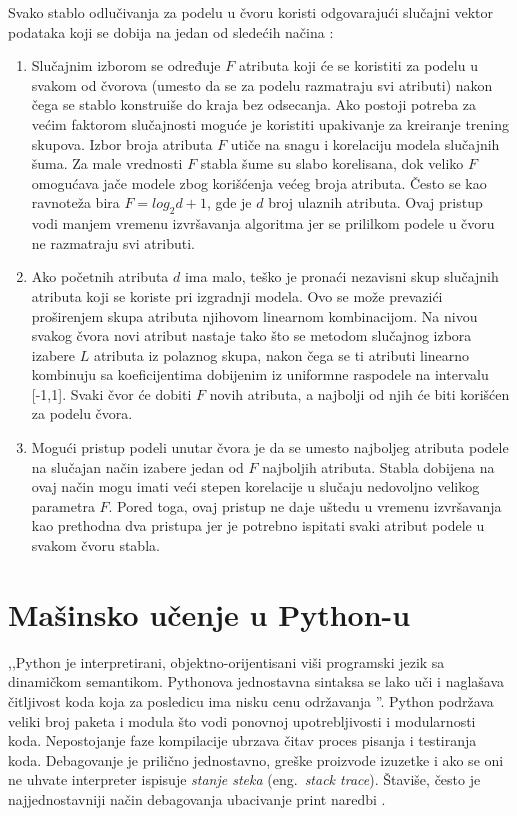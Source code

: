 \documentclass[12pt,oneside]{memoir}
\begin{document}
Svako stablo odlučivanja za podelu u čvoru koristi odgovarajući slučajni vektor podataka koji se dobija na jedan od sledećih načina \cite{mitic}:
\begin{enumerate}[1)]
\item Slučajnim izborom se određuje $F$ atributa koji će se koristiti za podelu u svakom od čvorova (umesto da se za podelu razmatraju svi atributi) nakon čega se stablo konstruiše do kraja bez odsecanja. Ako postoji potreba za većim faktorom slučajnosti moguće je koristiti upakivanje za kreiranje trening skupova. Izbor broja atributa $F$ utiče na snagu i korelaciju modela slučajnih šuma. Za male vrednosti $F$ stabla šume su slabo korelisana, dok veliko $F$ omogućava jače modele zbog korišćenja većeg broja atributa. Često se kao ravnoteža bira $F=log_2d+1$, gde je $d$ broj ulaznih atributa. Ovaj pristup vodi manjem vremenu izvršavanja algoritma jer se prililkom podele u čvoru ne razmatraju svi atributi. 
\item Ako početnih atributa $d$ ima malo, teško je pronaći nezavisni skup slučajnih atributa koji se koriste pri izgradnji modela. Ovo se može prevazići proširenjem skupa atributa njihovom linearnom kombinacijom. Na nivou svakog čvora novi atribut nastaje tako što se metodom slučajnog izbora izabere $L$ atributa iz polaznog skupa, nakon čega se ti atributi linearno kombinuju sa koeficijentima dobijenim iz uniformne raspodele na intervalu [-1,1]. Svaki čvor će dobiti $F$ novih atributa, a najbolji od njih će biti korišćen za podelu čvora. 
\item Mogući pristup podeli unutar čvora je da se umesto najboljeg atributa podele na slučajan način izabere jedan od $F$ najboljih atributa. Stabla dobijena na ovaj način mogu imati veći stepen korelacije u slučaju nedovoljno velikog parametra $F$. Pored toga, ovaj pristup ne daje uštedu u vremenu izvršavanja kao prethodna dva pristupa jer je potrebno ispitati svaki atribut podele u svakom čvoru stabla. 
\end{enumerate}

\section{Mašinsko učenje u Python-u}
,,Python je interpretirani, objektno-orijentisani viši programski jezik sa dinamičkom semantikom. Pythonova jednostavna sintaksa se lako uči i naglašava čitljivost koda koja za posledicu ima nisku cenu održavanja \cite{python-blurb}''. Python podržava veliki broj paketa i modula što vodi ponovnoj upotrebljivosti i modularnosti koda. Nepostojanje faze kompilacije ubrzava čitav proces pisanja i testiranja koda. Debagovanje je prilično jednostavno, greške proizvode izuzetke i ako se oni ne uhvate interpreter ispisuje \textit{stanje steka} (eng.~\textit{stack trace}). Štaviše, često je najjednostavniji način debagovanja ubacivanje print naredbi \cite{python-blurb}. %
\end{document}
